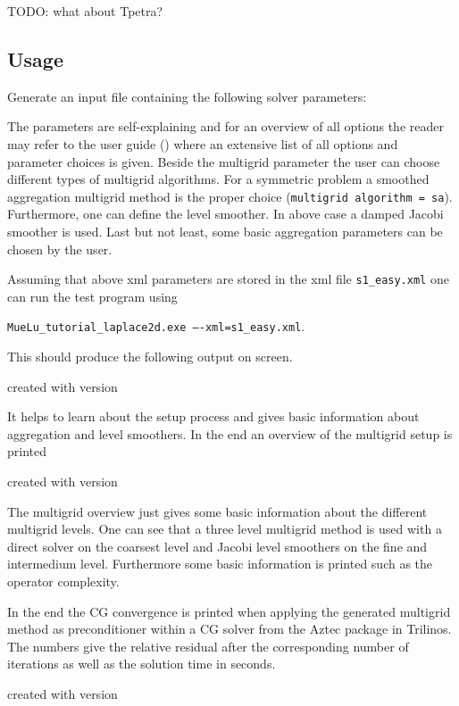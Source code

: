 \documentclass{article}
\newcommand\printScreenOutput[1]{

{\vspace{-0.3cm}\hfill\tiny{created with \muelu version }}
}
\begin{document}
TODO: what about Tpetra?

\subsection{Usage}


Generate an input file containing the following solver parameters: 
\small

\normalsize

The parameters are self-explaining and for an overview of all options the reader may refer to the \muelu user guide (\cite{Mue}) where an extensive list of all options and parameter choices is given.
Beside the multigrid parameter the user can choose different types of multigrid algorithms. For a symmetric problem a smoothed aggregation multigrid method is the proper choice (\texttt{multigrid algorithm = sa}). Furthermore, one can define the level smoother. In above case a damped Jacobi smoother is used. Last but not least, some basic aggregation parameters can be chosen by the user. 

Assuming that above xml parameters are stored in the xml file \texttt{s1\_easy.xml} one can run the test program using
\begin{center}
\texttt{MueLu\_tutorial\_laplace2d.exe ----xml=s1\_easy.xml}.
\end{center}
This should produce the following output on screen.


\printScreenOutput{s1_easy.txt_3.fragment_1.fragment}

It helps to learn about the setup process and gives basic information about aggregation and level smoothers. In the end an overview of the multigrid setup is printed

\printScreenOutput{s1_easy.txt_3.fragment_3.fragment}

The multigrid overview just gives some basic information about the different multigrid levels. One can see that a three level multigrid method is used with a direct solver on the coarsest level and Jacobi level smoothers on the fine and intermedium level. Furthermore some basic information is printed such as the operator complexity.

In the end the CG convergence is printed when applying the generated multigrid method as preconditioner within a CG solver from the Aztec package in Trilinos.
The numbers give the relative residual after the corresponding number of iterations as well as the solution time in seconds.
\printScreenOutput{s1_easy.txt_5.fragment}
\end{document}
